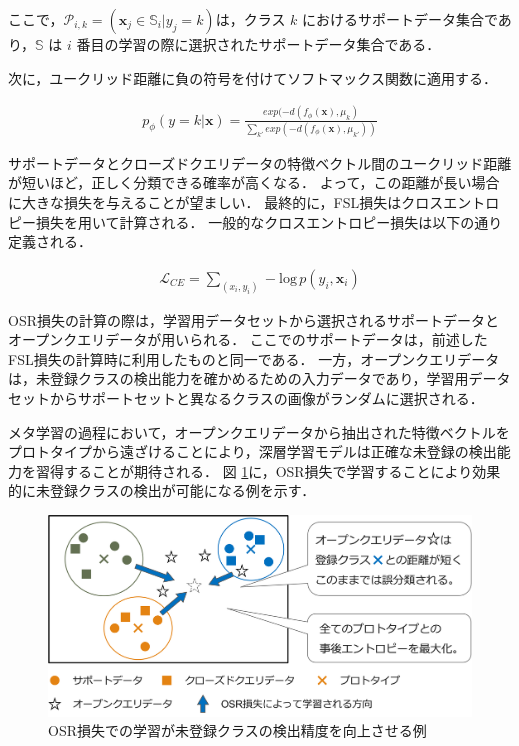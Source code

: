 \documentclass[a4paper,11pt,nomag]{jsreport}
\begin{document}
\noindent
ここで，$\mathcal{P}_{i,k}=(\mathbf{x}_j\in\mathbb{S}_i|y_j=k)$は，クラス $k$ におけるサポートデータ集合であり，$\mathbb{S}$ は $i$ 番目の学習の際に選択されたサポートデータ集合である．

次に，ユークリッド距離に負の符号を付けてソフトマックス関数に適用する．

\begin{align}
  p_\phi(y=k|\mathbf{x})=\frac{exp(-d(f_\phi(\mathbf{x}),\mu_{k})}{\sum_{k'}exp(-d(f_\phi(\mathbf{x}),\mu_{k'}))}
\end{align}

サポートデータとクローズドクエリデータの特徴ベクトル間のユークリッド距離が短いほど，正しく分類できる確率が高くなる．
よって，この距離が長い場合に大きな損失を与えることが望ましい．
最終的に，FSL損失はクロスエントロピー損失を用いて計算される．
一般的なクロスエントロピー損失は以下の通り定義される．

\begin{align}
  \mathcal{L}_{CE}=\sum_{(x_i,y_i)}-\textrm{log}\,p(y_i,\mathbf{x}_i)
\end{align}

OSR損失の計算の際は，学習用データセットから選択されるサポートデータとオープンクエリデータが用いられる．
ここでのサポートデータは，前述したFSL損失の計算時に利用したものと同一である．
一方，オープンクエリデータは，未登録クラスの検出能力を確かめるための入力データであり，学習用データセットからサポートセットと異なるクラスの画像がランダムに選択される．

メタ学習の過程において，オープンクエリデータから抽出された特徴ベクトルをプロトタイプから遠ざけることにより，深層学習モデルは正確な未登録の検出能力を習得することが期待される．
図 \ref{fig:osr_loss}に，OSR損失で学習することにより効果的に未登録クラスの検出が可能になる例を示す．

\begin{figure}[tbp]
  \centering
  \includegraphics[width=\linewidth, keepaspectratio]{image/osr_loss.png}
  \caption{OSR損失での学習が未登録クラスの検出精度を向上させる例}
  \label{fig:osr_loss}
\end{figure}
\end{document}
